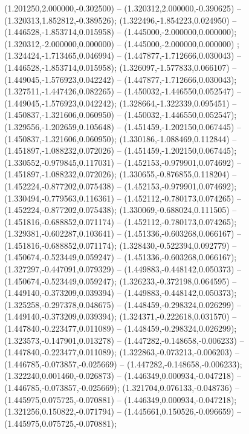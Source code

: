  (1.201250,2.000000,-0.302500) -- (1.320312,2.000000,-0.390625) -- (1.320313,1.852812,-0.389526);
 (1.322496,-1.854223,0.024950) -- (1.446528,-1.853714,0.015958) -- (1.445000,-2.000000,0.000000);
 (1.320312,-2.000000,0.000000) -- (1.445000,-2.000000,0.000000) ;
 (1.324424,-1.713465,0.046994) -- (1.447877,-1.712666,0.030043) -- (1.446528,-1.853714,0.015958);
 (1.326097,-1.577833,0.066107) -- (1.449045,-1.576923,0.042242) -- (1.447877,-1.712666,0.030043);
 (1.327511,-1.447426,0.082265) -- (1.450032,-1.446550,0.052547) -- (1.449045,-1.576923,0.042242);
 (1.328664,-1.322339,0.095451) -- (1.450837,-1.321606,0.060950) -- (1.450032,-1.446550,0.052547);
 (1.329556,-1.202659,0.105648) -- (1.451459,-1.202150,0.067445) -- (1.450837,-1.321606,0.060950);
 (1.330186,-1.088469,0.112844) -- (1.451897,-1.088232,0.072026) -- (1.451459,-1.202150,0.067445);
 (1.330552,-0.979845,0.117031) -- (1.452153,-0.979901,0.074692) -- (1.451897,-1.088232,0.072026);
 (1.330655,-0.876855,0.118204) -- (1.452224,-0.877202,0.075438) -- (1.452153,-0.979901,0.074692);
 (1.330494,-0.779563,0.116361) -- (1.452112,-0.780173,0.074265) -- (1.452224,-0.877202,0.075438);
 (1.330069,-0.688024,0.111505) -- (1.451816,-0.688852,0.071174) -- (1.452112,-0.780173,0.074265);
 (1.329381,-0.602287,0.103641) -- (1.451336,-0.603268,0.066167) -- (1.451816,-0.688852,0.071174);
 (1.328430,-0.522394,0.092779) -- (1.450674,-0.523449,0.059247) -- (1.451336,-0.603268,0.066167);
 (1.327297,-0.447091,0.079329) -- (1.449883,-0.448142,0.050373) -- (1.450674,-0.523449,0.059247);
 (1.326233,-0.372198,0.064595) -- (1.449140,-0.373209,0.039394) -- (1.449883,-0.448142,0.050373);
 (1.325258,-0.297378,0.048675) -- (1.448459,-0.298324,0.026299) -- (1.449140,-0.373209,0.039394);
 (1.324371,-0.222618,0.031570) -- (1.447840,-0.223477,0.011089) -- (1.448459,-0.298324,0.026299);
 (1.323573,-0.147901,0.013278) -- (1.447282,-0.148658,-0.006233) -- (1.447840,-0.223477,0.011089);
 (1.322863,-0.073213,-0.006203) -- (1.446785,-0.073857,-0.025669) -- (1.447282,-0.148658,-0.006233);
 (1.322240,0.001460,-0.026873) -- (1.446349,0.000934,-0.047218) -- (1.446785,-0.073857,-0.025669);
 (1.321704,0.076133,-0.048736) -- (1.445975,0.075725,-0.070881) -- (1.446349,0.000934,-0.047218);
 (1.321256,0.150822,-0.071794) -- (1.445661,0.150526,-0.096659) -- (1.445975,0.075725,-0.070881);
